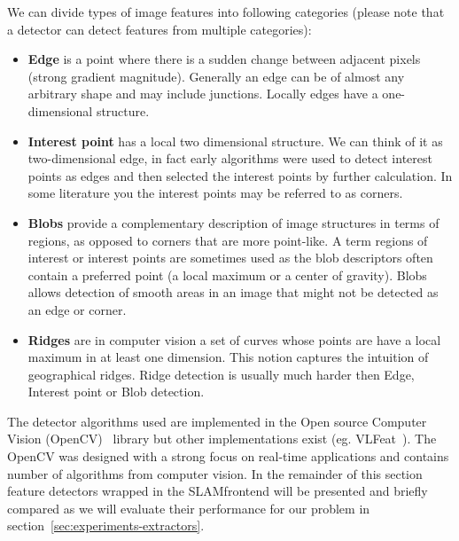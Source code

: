 We can divide types of image features into following categories (please note that a detector can detect features from multiple categories):
\begin{itemize}
	\item \textbf{Edge} is a point where there is a sudden change between adjacent pixels (strong gradient magnitude). Generally an edge can be of almost any arbitrary shape and may include junctions. Locally edges have a one-dimensional structure.
	\item \textbf{Interest point} has a local two dimensional structure. We can think of it as two-dimensional edge, in fact early algorithms were used to detect interest points as edges and then selected the interest points by further calculation. In some literature you the interest points may be referred to as corners.
	\item \textbf{Blobs} provide a complementary description of image structures in terms of regions, as opposed to corners that are more point-like. A term regions of interest or interest points are sometimes used as the blob descriptors often contain a preferred point (a local maximum or a center of gravity). Blobs allows detection of smooth areas in an image that might not be detected as an edge or corner.
	\item \textbf{Ridges} are in computer vision a set of curves whose points are have a local maximum in at least one dimension. This notion captures the intuition of geographical ridges. Ridge detection is usually much harder then Edge, Interest point or Blob detection.
\end{itemize}

The detector algorithms used are implemented in the Open source Computer Vision (OpenCV)~\cite{www:opencv} library but other implementations exist (eg. VLFeat~\cite{vlfeat}). The OpenCV was designed with a strong focus on real-time applications and contains number of algorithms from computer vision. In the remainder of this section feature detectors wrapped in the SLAM\textunderscore frontend will be presented and briefly compared as we will evaluate their performance for our problem in section~\ref{sec:experiments-extractors}.

